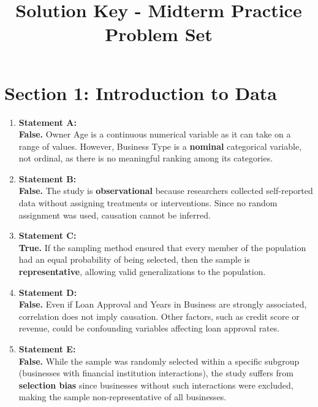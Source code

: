 \documentclass{article}
\title{Solution Key - Midterm Practice Problem Set}
\author{}
\date{}
\begin{document}
\maketitle

\section*{Section 1: Introduction to Data}

\begin{enumerate}

\item \textbf{Statement A:} \\
\textbf{False.} Owner Age is a continuous numerical variable as it can take on a range of values. However, Business Type is a \textbf{nominal} categorical variable, not ordinal, as there is no meaningful ranking among its categories.

\item \textbf{Statement B:} \\
\textbf{False.} The study is \textbf{observational} because researchers collected self-reported data without assigning treatments or interventions. Since no random assignment was used, causation cannot be inferred.

\item \textbf{Statement C:} \\
\textbf{True.} If the sampling method ensured that every member of the population had an equal probability of being selected, then the sample is \textbf{representative}, allowing valid generalizations to the population.

\item \textbf{Statement D:} \\
\textbf{False.} Even if Loan Approval and Years in Business are strongly associated, correlation does not imply causation. Other factors, such as credit score or revenue, could be confounding variables affecting loan approval rates.

\item \textbf{Statement E:} \\
\textbf{False.} While the sample was randomly selected within a specific subgroup (businesses with financial institution interactions), the study suffers from \textbf{selection bias} since businesses without such interactions were excluded, making the sample non-representative of all businesses.

\end{enumerate} %
\end{document}
